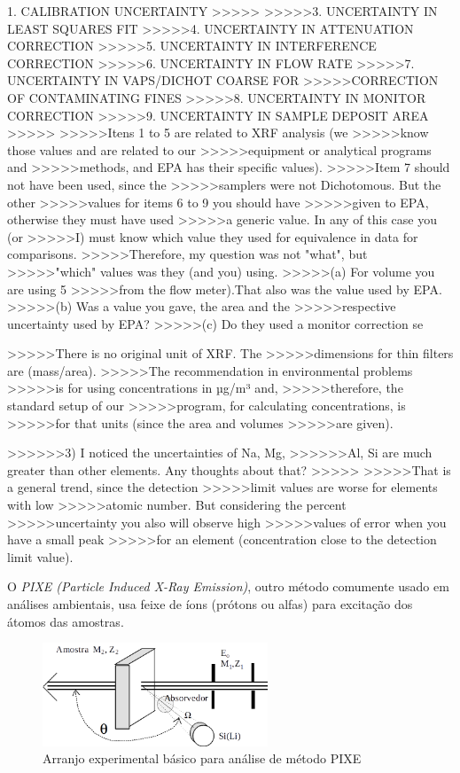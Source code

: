 1. CALIBRATION UNCERTAINTY
>>>>>
>>>>>3. UNCERTAINTY IN LEAST SQUARES FIT
>>>>>4. UNCERTAINTY IN ATTENUATION CORRECTION
>>>>>5. UNCERTAINTY IN INTERFERENCE CORRECTION
>>>>>6. UNCERTAINTY IN FLOW RATE
>>>>>7. UNCERTAINTY IN VAPS/DICHOT COARSE FOR
>>>>>CORRECTION OF CONTAMINATING FINES
>>>>>8. UNCERTAINTY IN MONITOR CORRECTION
>>>>>9. UNCERTAINTY IN SAMPLE DEPOSIT AREA
>>>>>
>>>>>Itens 1 to 5 are related to XRF analysis (we
>>>>>know those values and are related to our
>>>>>equipment or analytical programs and
>>>>>methods, and EPA has their specific values).
>>>>>Item 7 should not have been used, since the
>>>>>samplers were not Dichotomous. But the other
>>>>>values for items 6 to 9 you should have
>>>>>given to EPA, otherwise they must have used
>>>>>a generic value. In any of this case you (or
>>>>>I) must know which value they used for equivalence in data for comparisons.
>>>>>Therefore, my question was not "what", but
>>>>>"which" values was they (and you) using.
>>>>>(a)  For volume you are using 5%
>>>>>from the flow meter).That also was the value used by EPA.
>>>>>(b) Was a value you gave, the area and the
>>>>>respective uncertainty used by EPA?
>>>>>(c) Do they used a monitor correction se

>>>>>There is no original unit of XRF. The
>>>>>dimensions for thin filters are (mass/area).
>>>>>The recommendation in environmental problems
>>>>>is for using concentrations in µg/m³ and,
>>>>>therefore, the standard setup of our
>>>>>program, for calculating concentrations, is
>>>>>for that units (since the area and volumes
>>>>>are given).

>>>>>>3) I noticed the uncertainties of Na, Mg,
>>>>>>Al, Si are much greater than other elements. Any thoughts about that?
>>>>>
>>>>>That is a general trend, since the detection
>>>>>limit values are worse for elements with low
>>>>>atomic number. But considering the percent
>>>>>uncertainty you also will observe high
>>>>>values of error when you have a small peak
>>>>>for an element (concentration close to the detection limit value). 


O \textit{PIXE (Particle Induced X-Ray Emission)}, 
outro método comumente usado em análises ambientais, usa feixe de íons 
(prótons ou alfas) para excitação dos átomos das amostras.

\begin{figure}[H]
\begin{center} 
  \includegraphics[width=0.6\textwidth]{../inputs/images/arranjopixe.png}
  \caption{Arranjo experimental básico para análise de método PIXE 
           \citep{tabacniks2000} \label{fig:arranjopixe}}
\end{center}
\end{figure}

